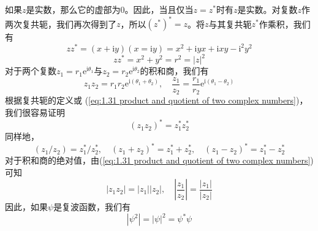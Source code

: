 	如果$z$是实数，那么它的虚部为0。因此，当且仅当$z = z^{\ast}$时有$z$是实数。对复数$z$作两次复共轭，我们再次得到了$z$，所以$\left(z^{\ast}\right)^{\ast}=z$。将$z$与其复共轭$z^{\ast}$作乘积，我们有
	\begin{equation*}
		zz^{\ast} = \left(x + \mathrm{i}y\right)\left(x= \mathrm{i}y\right) = x^2+\mathrm{i}yx+\mathrm{i}xy-\mathrm{i}^2y^2
	\end{equation*}
	\begin{equation}
		\boxed{zz^{\ast} = x^2+y^2=r^2=\left|z\right|^2}
		\label{eq:1.30 product of z and its complex conjugate}
	\end{equation}
	对于两个复数$z_1=r_1\mathrm{e}^{\mathrm{i}\theta_1}$与$z_2 = r_2\mathrm{e}^{\mathrm{i}\theta_2}$的积和商，我们有
	\begin{equation}
		z_1z_2 = r_1r_2\mathrm{e}^{\mathrm{i}\left(\theta_1+\theta_2\right)}, \quad \frac{z_1}{z_2} = \frac{r_1}{r_2}\mathrm{e}^{\mathrm{i} \left(\theta_1 - \theta_2\right)}
		\label{eq:1.31 product and quotient of two complex numbers}
	\end{equation}
	\indent 根据复共轭的定义或 (\ref{eq:1.31 product and quotient of two complex numbers})，我们很容易证明
	\begin{equation}
		\boxed{\left(z_1z_2\right)^{\ast} = z_1^{\ast} z_2^{\ast}}
		\label{eq:1.32 properties of complex conjugate}
	\end{equation}
	同样地，
	\begin{equation}
		\boxed{
				\left(z_1/z_2\right) = z_1^{\ast} / z_2^{\ast}, \quad \left(z_1+z_2\right)^{\ast} = z_1^{\ast} + z_2^{\ast} , \quad \left(z_1-z_2\right)^{\ast} = z_1^{\ast} - z_2^{\ast}}
		\label{eq:1.33 linear properties of complex conjugate
		}
	\end{equation}
	对于积和商的绝对值，由(\ref{eq:1.31 product and quotient of two complex numbers})可知
	\begin{equation}
		\left|z_1z_2\right|=\left|z_1\right|\left|z_2\right|, \quad \left|\frac{z_1}{z_2}\right| = \frac{\left|z_1\right|}{\left|z_2\right|}
		\label{eq:1.34 properties of product and quotient absolute values}
	\end{equation}
	因此，如果$\psi$是复波函数，我们有
	\begin{equation}
		\left|\psi^2\right| = \left|\psi\right|^2 = \psi^{\ast} \psi
		\label{eq:1.35 properties of psi wave function}
	\end{equation}
